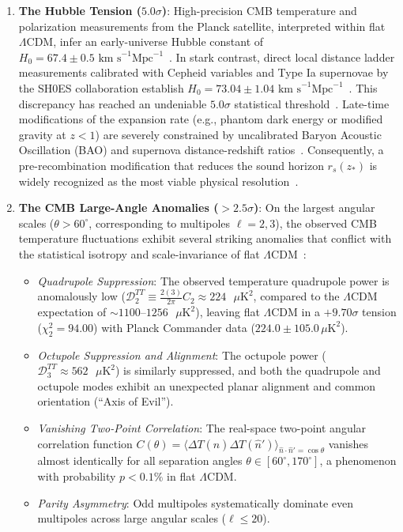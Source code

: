 \documentclass[11pt,a4paper]{article}
\theoremstyle{definition}
\newcommand{\LCDM}{\Lambda\mathrm{CDM}}
\begin{document}
\begin{enumerate}
    \item \textbf{The Hubble Tension ($5.0\sigma$)}: High-precision CMB temperature and polarization measurements from the Planck satellite, interpreted within flat $\LCDM$, infer an early-universe Hubble constant of $H_0 = 67.4 \pm 0.5\text{ km s}^{-1}\text{Mpc}^{-1}$~\cite{Planck2018Params}. In stark contrast, direct local distance ladder measurements calibrated with Cepheid variables and Type Ia supernovae by the SH0ES collaboration establish $H_0 = 73.04 \pm 1.04\text{ km s}^{-1}\text{Mpc}^{-1}$~\cite{Riess2022}. This discrepancy has reached an undeniable $5.0\sigma$ statistical threshold~\cite{Kamionkowski2023,Freedman2021,DiValentino2021}. Late-time modifications of the expansion rate (e.g., phantom dark energy or modified gravity at $z < 1$) are severely constrained by uncalibrated Baryon Acoustic Oscillation (BAO) and supernova distance-redshift ratios~\cite{DESI2024BAO,PantheonPlus2022}. Consequently, a pre-recombination modification that reduces the sound horizon $r_s(z_*)$ is widely recognized as the most viable physical resolution~\cite{Poulin2019,Poulin2023}.
    
    \item \textbf{The CMB Large-Angle Anomalies ($> 2.5\sigma$)}: On the largest angular scales ($\theta > 60^\circ$, corresponding to multipoles $\ell = 2, 3$), the observed CMB temperature fluctuations exhibit several striking anomalies that conflict with the statistical isotropy and scale-invariance of flat $\LCDM$~\cite{Planck2018Topology}:
    \begin{itemize}
        \item \textit{Quadrupole Suppression}: The observed temperature quadrupole power is anomalously low ($\mathcal{D}_2^{TT} \equiv \frac{2(3)}{2\pi} C_2 \approx 224\text{ }\mu\text{K}^2$, compared to the $\LCDM$ expectation of $\sim 1100\text{--}1256\text{ }\mu\text{K}^2$), leaving flat $\LCDM$ in a $+9.70\sigma$ tension ($\chi_2^2 = 94.00$) with Planck Commander data ($224.0 \pm 105.0\,\mu\text{K}^2$).
        \item \textit{Octupole Suppression and Alignment}: The octupole power ($\mathcal{D}_3^{TT} \approx 562\text{ }\mu\text{K}^2$) is similarly suppressed, and both the quadrupole and octupole modes exhibit an unexpected planar alignment and common orientation (``Axis of Evil'').
        \item \textit{Vanishing Two-Point Correlation}: The real-space two-point angular correlation function $C(\theta) = \langle \Delta T(\hat{n}) \Delta T(\hat{n}') \rangle_{\hat{n}\cdot\hat{n}' = \cos\theta}$ vanishes almost identically for all separation angles $\theta \in [60^\circ, 170^\circ]$, a phenomenon with probability $p < 0.1\%$ in flat $\LCDM$.
        \item \textit{Parity Asymmetry}: Odd multipoles systematically dominate even multipoles across large angular scales ($\ell \le 20$).
    \end{itemize}


\end{enumerate}
\end{document}
